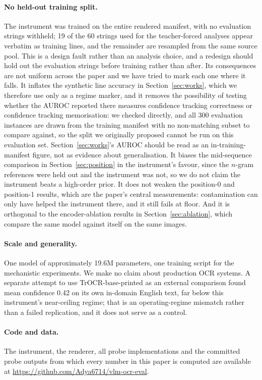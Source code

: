 \documentclass{article}
\begin{document}
\paragraph{No held-out training split.} The instrument was trained on the entire rendered
manifest, with no evaluation strings withheld; 19 of the 60 strings used for the teacher-forced
analyses appear verbatim as training lines, and the remainder are resampled from the same source
pool. This is a design fault rather than an analysis choice, and a redesign should hold out the
evaluation strings before training rather than after. Its consequences are not uniform across
the paper and we have tried to mark each one where it falls. It inflates the synthetic line accuracy in
Section~\ref{sec:works}, which we therefore use only as a regime marker, and it removes the
possibility of testing whether the AUROC reported there measures confidence tracking correctness
or confidence tracking memorisation: we checked directly, and all 300 evaluation instances are
drawn from the training manifest with no non-matching subset to compare against, so the split we
originally proposed cannot be run on this evaluation set. Section~\ref{sec:works}'s AUROC should
be read as an in-training-manifest figure, not as evidence about generalisation. It biases the mid-sequence comparison in Section~\ref{sec:position} in the instrument's
favour, since the $n$-gram references were held out and the instrument was not, so we do not
claim the instrument beats a high-order prior. It does not weaken the position-0 and position-1
results, which are the paper's central measurements: contamination can only have helped the
instrument there, and it still fails at floor. And it is orthogonal to the encoder-ablation
results in Section~\ref{sec:ablation}, which compare the same model against itself on the same
images.

\paragraph{Scale and generality.} One model of approximately 19.6M parameters, one training
script for the mechanistic experiments. We make no claim about production OCR systems. A
separate attempt to use TrOCR-base-printed as an external comparison found mean confidence
0.42 on its own in-domain English text, far below this instrument's near-ceiling regime; that
is an operating-regime mismatch rather than a failed replication, and it does not serve as a
control.

\paragraph{Code and data.} The instrument, the renderer, all probe implementations and the
committed probe outputs from which every number in this paper is computed are available at
\url{https://github.com/Adya6714/vlm-ocr-eval}.
\end{document}
